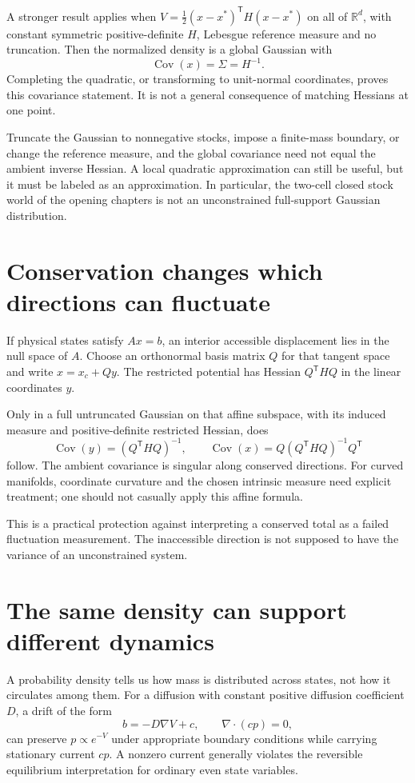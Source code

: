 A stronger result applies when $V=\tfrac12(x-x^*)^{\mathsf T}H(x-x^*)$ on all of $\mathbb R^d$, with constant symmetric positive-definite $H$, Lebesgue reference measure and no truncation. Then the normalized density is a global Gaussian with
\begin{equation}\label{eq:gaussian-covariance}
 \operatorname{Cov}(x)=\Sigma=H^{-1}.
\end{equation}
Completing the quadratic, or transforming to unit-normal coordinates, proves this covariance statement. It is not a general consequence of matching Hessians at one point.

Truncate the Gaussian to nonnegative stocks, impose a finite-mass boundary, or change the reference measure, and the global covariance need not equal the ambient inverse Hessian. A local quadratic approximation can still be useful, but it must be labeled as an approximation. In particular, the two-cell closed stock world of the opening chapters is not an unconstrained full-support Gaussian distribution.

\section{Conservation changes which directions can fluctuate}
If physical states satisfy $Ax=b$, an interior accessible displacement lies in the null space of $A$. Choose an orthonormal basis matrix $Q$ for that tangent space and write $x=x_c+Qy$. The restricted potential has Hessian $Q^{\mathsf T}H Q$ in the linear coordinates $y$.

Only in a full untruncated Gaussian on that affine subspace, with its induced measure and positive-definite restricted Hessian, does
\begin{equation}
 \operatorname{Cov}(y)=(Q^{\mathsf T}HQ)^{-1},\qquad
 \operatorname{Cov}(x)=Q(Q^{\mathsf T}HQ)^{-1}Q^{\mathsf T}
\end{equation}
follow. The ambient covariance is singular along conserved directions. For curved manifolds, coordinate curvature and the chosen intrinsic measure need explicit treatment; one should not casually apply this affine formula.

This is a practical protection against interpreting a conserved total as a failed fluctuation measurement. The inaccessible direction is not supposed to have the variance of an unconstrained system.

\section{The same density can support different dynamics}
A probability density tells us how mass is distributed across states, not how it circulates among them. For a diffusion with constant positive diffusion coefficient $D$, a drift of the form
\begin{equation}
 b=-D\nabla V+c,\qquad \nabla\!\cdot(c p)=0,
\end{equation}
can preserve $p\propto e^{-V}$ under appropriate boundary conditions while carrying stationary current $c p$. A nonzero current generally violates the reversible equilibrium interpretation for ordinary even state variables.


